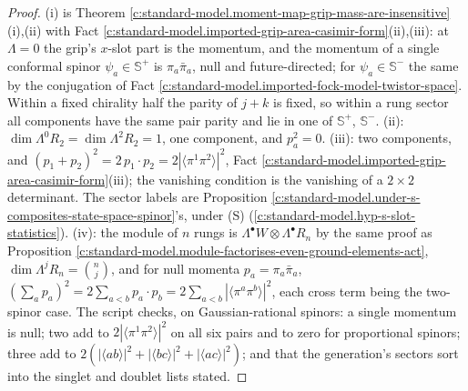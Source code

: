 \documentclass[11pt]{article}
\theoremstyle{definition}
\theoremstyle{plain}
\providecommand{\CS}{}\renewcommand{\CS}{{\mathbb{S}^{+}}}
\providecommand{\CSm}{}\renewcommand{\CSm}{{\mathbb{S}^{-}}}
\providecommand{\br}{}\renewcommand{\br}[1]{\langle #1\rangle}
\begin{document}
\begin{proof}
(i) is Theorem \ref{c:standard-model.moment-map-grip-mass-are-insensitive}(i),(ii) with Fact \ref{c:standard-model.imported-grip-area-casimir-form}(ii),(iii): at $\Lambda = 0$ the grip's $x$-slot part is the momentum, and the momentum of a single conformal spinor $\psi_{a} \in \CS$ is $\pi_{a}\bar\pi_{a}$, null and future-directed; for $\psi_{a} \in \CSm{}$ the same by the conjugation of Fact \ref{c:standard-model.imported-fock-model-twistor-space}. Within a fixed chirality half the parity of $j + k$ is fixed, so within a rung sector all components have the same pair parity and lie in one of $\CS$, $\CSm{}$. (ii): $\dim\Lambda^{0}R_{2} = \dim\Lambda^{2}R_{2} = 1$, one component, and $p_{a}^{2} = 0$. (iii): two components, and $(p_{1} + p_{2})^{2} = 2\,p_{1} \cdot p_{2} = 2|\br{\pi^{1}\pi^{2}}|^{2}$, Fact \ref{c:standard-model.imported-grip-area-casimir-form}(iii); the vanishing condition is the vanishing of a $2 \times 2$ determinant. The sector labels are Proposition \ref{c:standard-model.under-s-composites-state-space-spinor}'s, under (S) (\ref{c:standard-model.hyp-s-slot-statistics}). (iv): the module of $n$ rungs is $\Lambda^{\bullet}W \otimes \Lambda^{\bullet}R_{n}$ by the same proof as Proposition \ref{c:standard-model.module-factorises-even-ground-elements-act}, $\dim\Lambda^{j}R_{n} = \binom{n}{j}$, and for null momenta $p_{a} = \pi_{a}\bar\pi_{a}$, $(\sum_{a} p_{a})^{2} = 2\sum_{a<b}p_{a} \cdot p_{b} = 2\sum_{a<b}|\br{\pi^{a}\pi^{b}}|^{2}$, each cross term being the two-spinor case. The script checks, on Gaussian-rational spinors: a single momentum is null; two add to $2|\br{\pi^{1}\pi^{2}}|^{2}$ on all six pairs and to zero for proportional spinors; three add to $2(|\br{ab}|^{2} + |\br{bc}|^{2} + |\br{ac}|^{2})$; and that the generation's sectors sort into the singlet and doublet lists stated.

\end{proof}
\end{document}
